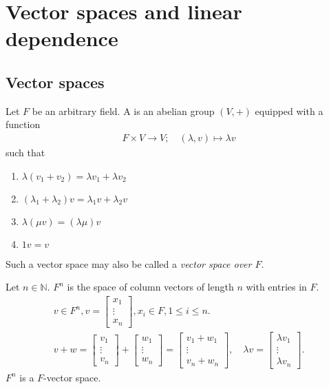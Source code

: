 \section{Vector spaces and linear dependence}

\subsection{Vector spaces}

\begin{definition}
    Let $F$ be an arbitrary field.
    A  is an abelian group $(V, +)$ equipped with a function
    \begin{align*}
        F \times V \to V;\quad (\lambda, v) \mapsto \lambda v
    \end{align*}
    such that
    \begin{enumerate}
        \item $\lambda(v_1 + v_2) = \lambda v_1 + \lambda v_2$
        \item $(\lambda_1 + \lambda_2) v = \lambda_1 v + \lambda_2 v$
        \item $\lambda ( \mu v ) = ( \lambda \mu ) v$
        \item $1 v = v$
    \end{enumerate}
    Such a vector space may also be called a \textit{vector space over $F$}.
\end{definition}

\begin{example}
    Let $n \in \mathbb{N}$.
    $F^n$ is the space of column vectors of length $n$ with entries in $F$.
    \begin{gather*}
        v \in F^n, v = \begin{bmatrix} x_1 \\ \vdots \\ x_n\end{bmatrix}, x_i \in F, 1 \leq i \leq n. \\
        v + w = \begin{bmatrix}v_1 \\ \vdots \\ v_n\end{bmatrix} + \begin{bmatrix}w_1 \\ \vdots \\ w_n\end{bmatrix} = \begin{bmatrix}v_1 + w_1 \\ \vdots \\ v_n + w_n\end{bmatrix},\quad \lambda v = \begin{bmatrix} \lambda v_1 \\ \vdots \\ \lambda v_n\end{bmatrix}.
    \end{gather*} 
    $F^n$ is a $F$-vector space.
\end{example} 


